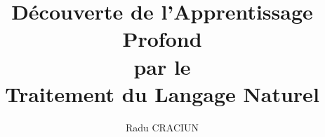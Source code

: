 \documentclass[11pt, a4paper, twoside]{report}
\begin{document}
\title{Découverte de l'Apprentissage Profond\\ par le\\ Traitement du Langage Naturel}
\author{Radu CRACIUN}
\maketitle

\tableofcontents
\end{document}
